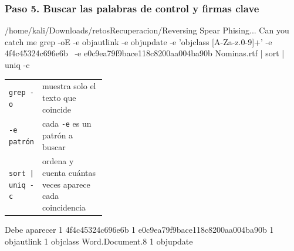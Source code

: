\documentclass[11pt,a4paper]{article}
\begin{document}
\subsubsection*{Paso 5. Buscar las palabras de control y firmas clave}
\begin{comando}{/home/kali/Downloads/retosRecuperacion/Reversing Spear Phising... Can you catch me}
grep -oE -e objautlink -e objupdate -e 'objclass [A-Za-z.0-9]+' -e 4f4c45324c696e6b \
  -e e0c9ea79f9bace118c8200aa004ba90b Nominas.rtf | sort | uniq -c
\end{comando}
\begin{tcolorbox}[enhanced, breakable, colback=gray!3, colframe=gray!35, boxrule=0.3pt, arc=1pt, left=4pt, right=4pt, top=2pt, bottom=2pt, fonttitle=\sffamily\scriptsize\bfseries, coltitle=black!70, colbacktitle=gray!10, title={Qué hace cada parte}, attach title to upper, before skip=2pt, after skip=4pt, fontupper=\small]
\par{\renewcommand{\arraystretch}{1.12}\begin{tabularx}{\linewidth}{@{}>{\raggedright\arraybackslash}p{0.33\linewidth}>{\raggedright\arraybackslash}X@{}}
\texttt{grep -o} & muestra solo el texto que coincide \\
\texttt{-e patrón} & cada \texttt{-e} es un patrón a buscar \\
\texttt{sort |\allowbreak{} uniq -c} & ordena y cuenta cuántas veces aparece cada coincidencia \\
\end{tabularx}}
\end{tcolorbox}
\begin{salida}{Debe aparecer}
      1 4f4c45324c696e6b
      1 e0c9ea79f9bace118c8200aa004ba90b
      1 objautlink
      1 objclass Word.Document.8
      1 objupdate
\end{salida}
\end{document}
